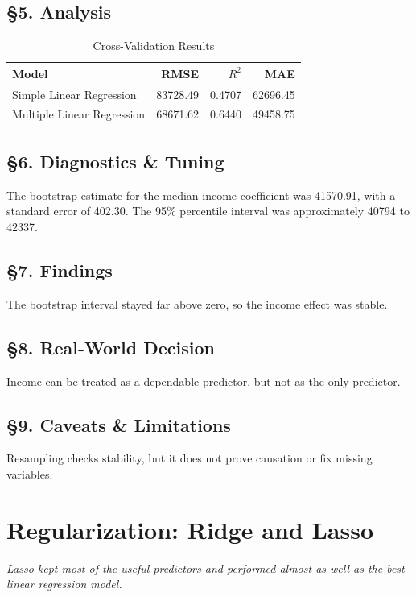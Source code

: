 \documentclass[12pt]{report}
\begin{document}
\section*{\S5. Analysis}

\begin{table}[H]
\centering
\caption{Cross-Validation Results}
\begin{tabular}{lrrr}
\toprule
Model & RMSE & $R^2$ & MAE \\
\midrule
Simple Linear Regression & 83728.49 & 0.4707 & 62696.45 \\
Multiple Linear Regression & 68671.62 & 0.6440 & 49458.75 \\
\bottomrule
\end{tabular}
\end{table}

\section*{\S6. Diagnostics \& Tuning}
The bootstrap estimate for the median-income coefficient was 41570.91, with a standard error of 402.30. The 95\% percentile interval was approximately 40794 to 42337.

\section*{\S7. Findings}
The bootstrap interval stayed far above zero, so the income effect was stable.

\section*{\S8. Real-World Decision}
Income can be treated as a dependable predictor, but not as the only predictor.

\section*{\S9. Caveats \& Limitations}
Resampling checks stability, but it does not prove causation or fix missing variables.

\newpage

\chapter{Regularization: Ridge and Lasso}

\begin{center}
\textit{Lasso kept most of the useful predictors and performed almost as well as the best linear regression model.}
\end{center}
\end{document}
